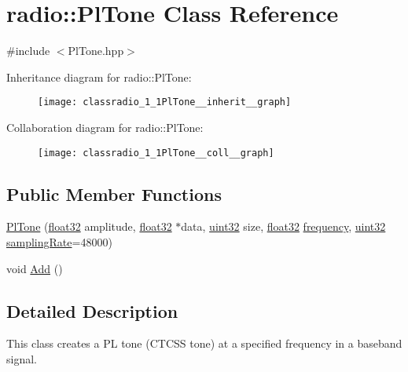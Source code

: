 \hypertarget{classradio_1_1PlTone}{\section{radio\+:\+:Pl\+Tone Class Reference}
\label{classradio_1_1PlTone}
}


{\ttfamily \#include $<$Pl\+Tone.\+hpp$>$}



Inheritance diagram for radio\+:\+:Pl\+Tone\+:
\nopagebreak
\begin{figure}[H]
\begin{center}
\leavevmode
\texttt{[image: classradio\_1\_1PlTone\_\_inherit\_\_graph]}
\end{center}
\end{figure}


Collaboration diagram for radio\+:\+:Pl\+Tone\+:
\nopagebreak
\begin{figure}[H]
\begin{center}
\leavevmode
\texttt{[image: classradio\_1\_1PlTone\_\_coll\_\_graph]}
\end{center}
\end{figure}
\subsection*{Public Member Functions}
\begin{DoxyCompactItemize}
\item 
\hyperlink{classradio_1_1PlTone_a4fc745767c58044e79c4537fdc23d2a5}{Pl\+Tone} (\hyperlink{definitions_8hpp_aacdc525d6f7bddb3ae95d5c311bd06a1}{float32} amplitude, \hyperlink{definitions_8hpp_aacdc525d6f7bddb3ae95d5c311bd06a1}{float32} $\ast$data, \hyperlink{definitions_8hpp_a1134b580f8da4de94ca6b1de4d37975e}{uint32} size, \hyperlink{definitions_8hpp_aacdc525d6f7bddb3ae95d5c311bd06a1}{float32} \hyperlink{classradio_1_1Sinusoid_ad429b5dd330e96aaf89a0d48ef59d3f2}{frequency}, \hyperlink{definitions_8hpp_a1134b580f8da4de94ca6b1de4d37975e}{uint32} \hyperlink{classradio_1_1Sinusoid_a964d64aae9acc4ea5d752534a33d76b8}{sampling\+Rate}=48000)
\item 
void \hyperlink{classradio_1_1PlTone_a9e19b2d5106b35626d4839f04f9b9f95}{Add} ()
\end{DoxyCompactItemize}


\subsection{Detailed Description}
This class creates a P\+L tone (C\+T\+C\+S\+S tone) at a specified frequency in a baseband signal. 


